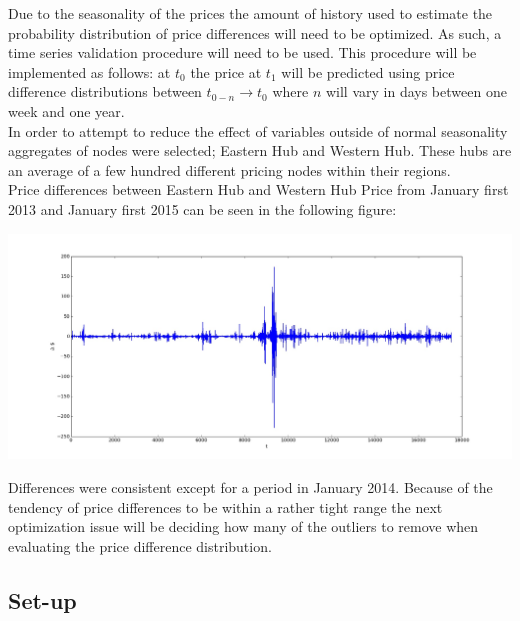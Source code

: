 \documentclass{report}
\begin{document}
Due to the seasonality of the prices the amount of history used to estimate the
probability distribution of price differences will need to be optimized. As such,
a time series validation procedure will need to be used. This procedure will be
implemented as follows: at $t_0$ the price at $t_1$ will be predicted using price
difference distributions between $t_{0-n} \rightarrow t_0$ where $n$ will vary in days
between one week and one year.\\

In order to attempt to reduce the effect of variables outside of normal seasonality
aggregates of nodes were selected; Eastern Hub and Western Hub. These hubs are an average
of a few hundred different pricing nodes within their regions.\\

Price differences between Eastern Hub and Western Hub Price from
January first 2013 and January first 2015 can be seen in the following figure:
\begin{center}
\includegraphics[width=500pt, keepaspectratio=true]{price_differences.jpg}
\end{center}
Differences were consistent except for a period in January 2014. Because of the
tendency of price differences to be within a rather tight range the next optimization
issue will be deciding how many of the outliers to remove when evaluating the
price difference distribution.\\

\subsection*{Set-up}
\end{document}
